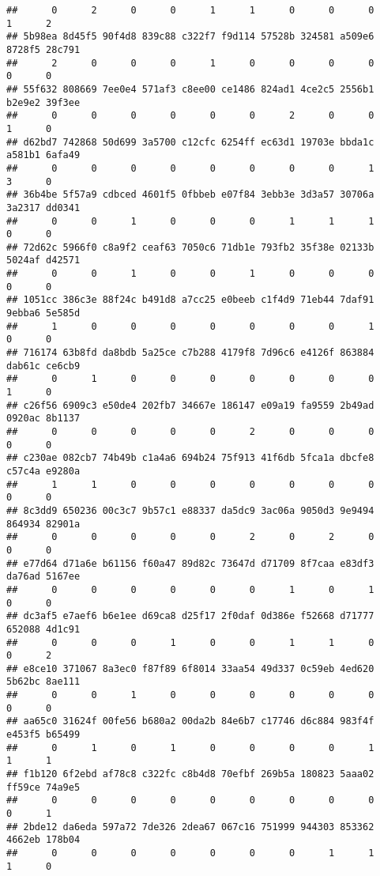 \documentclass[
]{article}
\begin{document}
\begin{verbatim}
##      0      2      0      0      1      1      0      0      0      1      2 
## 5b98ea 8d45f5 90f4d8 839c88 c322f7 f9d114 57528b 324581 a509e6 8728f5 28c791 
##      2      0      0      0      1      0      0      0      0      0      0 
## 55f632 808669 7ee0e4 571af3 c8ee00 ce1486 824ad1 4ce2c5 2556b1 b2e9e2 39f3ee 
##      0      0      0      0      0      0      2      0      0      1      0 
## d62bd7 742868 50d699 3a5700 c12cfc 6254ff ec63d1 19703e bbda1c a581b1 6afa49 
##      0      0      0      0      0      0      0      0      1      3      0 
## 36b4be 5f57a9 cdbced 4601f5 0fbbeb e07f84 3ebb3e 3d3a57 30706a 3a2317 dd0341 
##      0      0      1      0      0      0      1      1      1      0      0 
## 72d62c 5966f0 c8a9f2 ceaf63 7050c6 71db1e 793fb2 35f38e 02133b 5024af d42571 
##      0      0      1      0      0      1      0      0      0      0      0 
## 1051cc 386c3e 88f24c b491d8 a7cc25 e0beeb c1f4d9 71eb44 7daf91 9ebba6 5e585d 
##      1      0      0      0      0      0      0      0      1      0      0 
## 716174 63b8fd da8bdb 5a25ce c7b288 4179f8 7d96c6 e4126f 863884 dab61c ce6cb9 
##      0      1      0      0      0      0      0      0      0      1      0 
## c26f56 6909c3 e50de4 202fb7 34667e 186147 e09a19 fa9559 2b49ad 0920ac 8b1137 
##      0      0      0      0      0      2      0      0      0      0      0 
## c230ae 082cb7 74b49b c1a4a6 694b24 75f913 41f6db 5fca1a dbcfe8 c57c4a e9280a 
##      1      1      0      0      0      0      0      0      0      0      0 
## 8c3dd9 650236 00c3c7 9b57c1 e88337 da5dc9 3ac06a 9050d3 9e9494 864934 82901a 
##      0      0      0      0      0      2      0      2      0      0      0 
## e77d64 d71a6e b61156 f60a47 89d82c 73647d d71709 8f7caa e83df3 da76ad 5167ee 
##      0      0      0      0      0      0      1      0      1      0      0 
## dc3af5 e7aef6 b6e1ee d69ca8 d25f17 2f0daf 0d386e f52668 d71777 652088 4d1c91 
##      0      0      0      1      0      0      1      1      0      0      2 
## e8ce10 371067 8a3ec0 f87f89 6f8014 33aa54 49d337 0c59eb 4ed620 5b62bc 8ae111 
##      0      0      1      0      0      0      0      0      0      0      0 
## aa65c0 31624f 00fe56 b680a2 00da2b 84e6b7 c17746 d6c884 983f4f e453f5 b65499 
##      0      1      0      1      0      0      0      0      1      1      1 
## f1b120 6f2ebd af78c8 c322fc c8b4d8 70efbf 269b5a 180823 5aaa02 ff59ce 74a9e5 
##      0      0      0      0      0      0      0      0      0      0      1 
## 2bde12 da6eda 597a72 7de326 2dea67 067c16 751999 944303 853362 4662eb 178b04 
##      0      0      0      0      0      0      0      1      1      1      0 

\end{verbatim}
\end{document}

